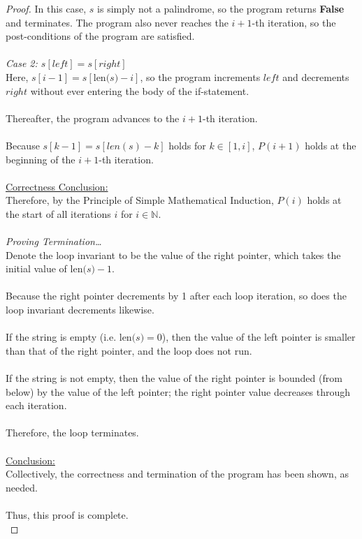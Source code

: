 \documentclass[12pt]{article}
\begin{document}
\begin{proof}
    In this case, $s$ is simply not a palindrome, so the program returns \textbf{False} and terminates. The program also never reaches the $i+1$-th iteration, so the post-conditions of the program are satisfied. \\
    \\
    \textit{Case 2: $s[left] = s[right]$} \\
    Here, $s[i - 1] = s[\text{len($s$)} - i]$, so the program increments $left$ and decrements $right$ without ever entering the body of the if-statement. \\
    \\
    Thereafter, the program advances to the $i+1$-th iteration. \\
    \\
    Because $s[k-1] = s[len(s)-k]$ holds for $k \in [1, i]$, $P(i+1)$ holds at the beginning of the $i+1$-th iteration. \\
    \\
    \underline{Correctness Conclusion:} \\
    Therefore, by the Principle of Simple Mathematical Induction, $P(i)$ holds at the start of all iterations $i$ for $i \in \mathbb{N}$. \\
    \\
    \textit{Proving Termination\dots} \\
    Denote the loop invariant to be the value of the right pointer, which takes the initial value of $\text{len($s$)} - 1$. \\
    \\
    Because the right pointer decrements by 1 after each loop iteration, so does the loop invariant decrements likewise. \\
    \\
    If the string is empty (i.e. $\text{len($s$)} = 0$), then the value of the left pointer is smaller than that of the right pointer, and the loop does not run. \\
    \\
    If the string is not empty, then the value of the right pointer is bounded (from below) by the value of the left pointer; the right pointer value decreases through each iteration. \\
    \\
    Therefore, the loop terminates. \\
    \\
    \underline{Conclusion:} \\
    Collectively, the correctness and termination of the program has been shown, as needed. \\
    \\
    Thus, this proof is complete. \\ 
\end{proof}
\end{document}
